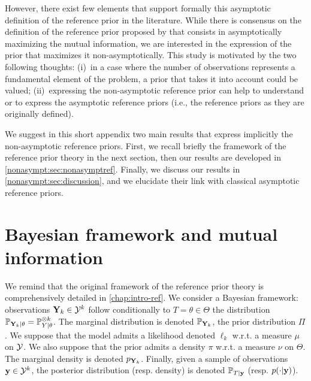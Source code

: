 
However, there exist few elements that support formally this asymptotic definition of the reference prior in the literature.
While there is consensus on the definition of the reference prior proposed by \citet{bernardo_reference_1979} that consists in asymptotically maximizing the mutual information, we are interested in the expression of the prior that maximizes it non-asymptotically.
This study is motivated by the two following thoughts: (i)~in a case where the number of observations represents a fundamental element of the problem, a prior that takes it into account could be valued; (ii)~expressing the non-asymptotic reference prior can help to understand or to express the asymptotic reference priors (i.e., the reference priors as they are originally defined).

We suggest in this short appendix two main results that express implicitly the non-asymptotic reference priors. First, we recall briefly the framework of the reference prior theory in the next section, then our results are developed in \cref{nonasympt:sec:nonasymptref}.
Finally, we discuss our results in \cref{nonasympt:sec:discussion}, and we elucidate their link with classical asymptotic reference priors.




\section{Bayesian framework and mutual information}\label{nonasympt:sec:framework}

We remind that the original framework of the reference prior theory is comprehensively detailed in \cref{chap:intro-ref}. We consider a Bayesian framework: observations $\mathbf{Y}_k\in\mathcal{Y}^k$ follow conditionally to $T=\theta\in\Theta$ the distribution $\mathbb{P}_{\mathbf{Y}_k|\theta}=\mathbb{P}_{Y|\theta}^{\otimes k}$. The marginal distribution is denoted  $\mathbb{P}_{\mathbf{Y}_k}$,  the prior distribution $\varPi$. %
We suppose that the model admits a likelihood denoted $\ell_k$ w.r.t. a measure $\mu$ on $\mathcal{Y}$.
We also suppose that the prior admits a density $\pi$ w.r.t. a measure $\nu$ on $\Theta$.
The marginal density is denoted $p_{\mathbf{Y}_k}$. Finally, given a sample of observations $\mathbf{y}\in\mathcal{Y}^k$, the posterior distribution (resp. density) is denoted $\mathbb{P}_{T|\mathbf{y}}$ (resp. $p(\cdot|\mathbf{y})$).


